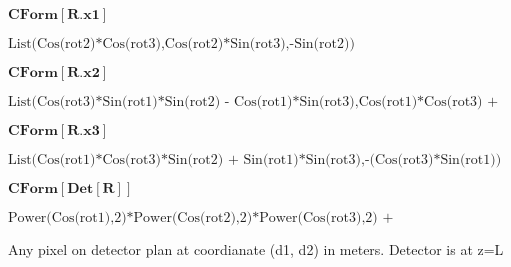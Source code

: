 \documentclass{article}
\begin{document}
\begin{doublespace}
\noindent\(\pmb{\text{CForm}[R.\text{x1}]}\)
\end{doublespace}

\begin{doublespace}
\noindent\(\text{List(Cos(rot2)*Cos(rot3),Cos(rot2)*Sin(rot3),-Sin(rot2))}\)
\end{doublespace}

\begin{doublespace}
\noindent\(\pmb{\text{CForm}[R.\text{x2}]}\)
\end{doublespace}

\begin{doublespace}
\noindent\(\text{List(Cos(rot3)*Sin(rot1)*Sin(rot2) - Cos(rot1)*Sin(rot3),Cos(rot1)*Cos(rot3) + Sin(rot1)*Sin(rot2)*Sin(rot3),Cos(rot2)*Sin(rot1))}\)
\end{doublespace}

\begin{doublespace}
\noindent\(\pmb{\text{CForm}[R.\text{x3}]}\)
\end{doublespace}

\begin{doublespace}
\noindent\(\text{List(Cos(rot1)*Cos(rot3)*Sin(rot2) + Sin(rot1)*Sin(rot3),-(Cos(rot3)*Sin(rot1)) + Cos(rot1)*Sin(rot2)*Sin(rot3),Cos(rot1)*Cos(rot2))}\)
\end{doublespace}

\begin{doublespace}
\noindent\(\pmb{\text{CForm}[\text{Det}[R]]}\)
\end{doublespace}

\begin{doublespace}
\noindent\(\text{Power(Cos(rot1),2)*Power(Cos(rot2),2)*Power(Cos(rot3),2) + Power(Cos(rot2),2)*Power(Cos(rot3),2)*Power(Sin(rot1),2) + Power(Cos(rot1),2)*Power(Cos(rot3),2)*Power(Sin(rot2),2)
+ 
   Power(Cos(rot3),2)*Power(Sin(rot1),2)*Power(Sin(rot2),2) + Power(Cos(rot1),2)*Power(Cos(rot2),2)*Power(Sin(rot3),2) + Power(Cos(rot2),2)*Power(Sin(rot1),2)*Power(Sin(rot3),2)
+ 
   Power(Cos(rot1),2)*Power(Sin(rot2),2)*Power(Sin(rot3),2) + Power(Sin(rot1),2)*Power(Sin(rot2),2)*Power(Sin(rot3),2)}\)
\end{doublespace}

Any pixel on detector plan at coordianate (d1, d2) in meters. Detector is at z=L

\begin{doublespace}
\noindent\(\pmb{\text{}}\)
\end{doublespace}
\end{document}

